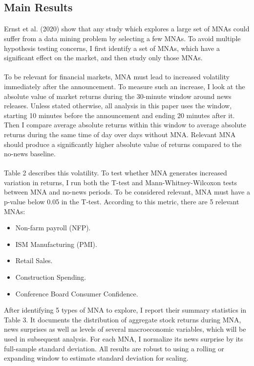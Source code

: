\documentclass[12pt]{article}
\begin{document}
\subsection{Main Results} \label{sec:Model}

\paragraph{}
Ernst et al. (2020) show that any study which explores a large set of MNAs could suffer from a data mining problem by selecting a few MNAs. To avoid multiple hypothesis testing concerns, I first identify a set of MNAs, which have a significant effect on the market, and then study only those MNAs. 
\paragraph{}
To be relevant for financial markets, MNA must lead to increased volatility immediately after the announcement. To measure such an increase, I look at the absolute value of market returns during the 30-minute window around news releases. Unless stated otherwise, all analysis in this paper uses the window, starting 10 minutes before the announcement and ending 20 minutes after it. Then I compare average absolute returns within this window to average absolute returns during the same time of day over days without MNA. Relevant MNA should produce a significantly higher absolute value of returns compared to the no-news baseline.  
\paragraph{}
Table 2 describes this volatility. To test whether MNA generates increased variation in returns, I run both the T-test and Mann-Whitney-Wilcoxon tests between MNA and no-news periods. To be considered relevant, MNA must have a p-value below 0.05 in the T-test. According to this metric, there are 5 relevant MNAs: 
\begin{itemize}
    \item {Non-farm payroll (NFP).}
    \item {ISM Manufacturing (PMI).}
    \item {Retail Sales.}
    \item {Construction Spending.}
    \item {Conference Board Consumer Confidence.}
\end{itemize}
After identifying 5 types of MNA to explore, I report their summary statistics in Table 3. It documents the distribution of aggregate stock returns during MNA, news surprises as well as levels of several macroeconomic variables, which will be used in subsequent analysis. For each MNA, I normalize its news surprise by its full-sample standard deviation. All results are robust to using a rolling or expanding window to estimate standard deviation for scaling.
\end{document}
